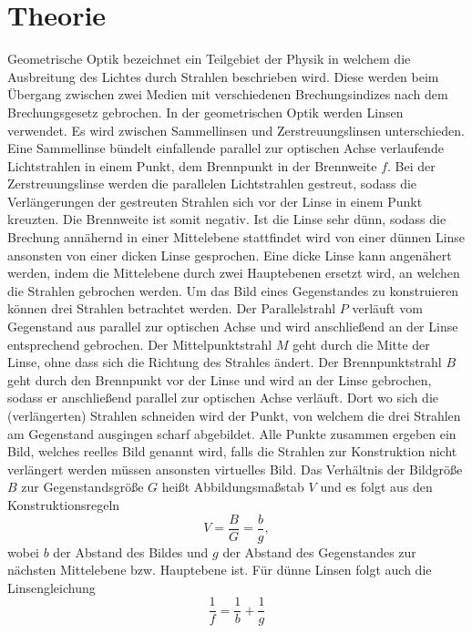 
\section{Theorie}
\label{sec:Theorie}

Geometrische Optik bezeichnet ein Teilgebiet der Physik in welchem die Ausbreitung des Lichtes durch Strahlen beschrieben wird. Diese werden beim Übergang zwischen zwei Medien mit verschiedenen Brechungsindizes nach dem Brechungsgesetz gebrochen. In der geometrischen Optik werden Linsen verwendet. Es wird zwischen Sammellinsen und Zerstreuungslinsen unterschieden. Eine Sammellinse bündelt einfallende parallel zur optischen Achse verlaufende Lichtstrahlen in einem Punkt, dem Brennpunkt in der Brennweite $f$. Bei der Zerstreuungslinse werden die parallelen Lichtstrahlen gestreut, sodass die Verlängerungen der gestreuten Strahlen sich vor der Linse in einem Punkt kreuzten. Die Brennweite ist somit negativ. Ist die Linse sehr dünn, sodass die Brechung annähernd in einer Mittelebene stattfindet wird von einer dünnen Linse ansonsten von einer dicken Linse gesprochen. Eine dicke Linse kann angenähert werden, indem die Mittelebene durch zwei Hauptebenen ersetzt wird, an welchen die Strahlen gebrochen werden. Um das Bild eines Gegenstandes zu konstruieren können drei Strahlen betrachtet werden. Der Parallelstrahl $P$ verläuft vom Gegenstand aus parallel zur optischen Achse und wird anschließend an der Linse entsprechend gebrochen. Der Mittelpunktstrahl $M$ geht durch die Mitte der Linse, ohne dass sich die Richtung des Strahles ändert. Der Brennpunktstrahl $B$ geht durch den Brennpunkt vor der Linse und wird an der Linse gebrochen, sodass er anschließend parallel zur optischen Achse verläuft. Dort wo sich die (verlängerten) Strahlen schneiden wird der Punkt, von welchem die drei Strahlen am Gegenstand ausgingen scharf abgebildet. Alle Punkte zusammen ergeben ein Bild, welches reelles Bild genannt wird, falls die Strahlen zur Konstruktion nicht verlängert werden müssen ansonsten virtuelles Bild. Das Verhältnis der Bildgröße $B$ zur Gegenstandsgröße $G$ heißt Abbildungsmaßstab $V$ und es folgt aus den Konstruktionsregeln
\begin{equation}
 V = \frac{B}{G}=\frac{b}{g},
\end{equation}
wobei $b$ der Abstand des Bildes und $g$ der Abstand des Gegenstandes zur nächsten Mittelebene bzw. Hauptebene ist. Für dünne Linsen folgt auch die Linsengleichung
\begin{equation}
	\frac{1}{f}=\frac{1}{b}+\frac{1}{g}
\end{equation}

